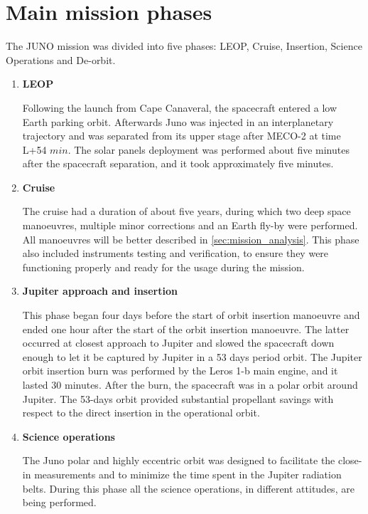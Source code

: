 \section{Main mission phases}
\label{sec:phases}

The JUNO mission was divided into five phases: LEOP, Cruise, Insertion, Science Operations and De-orbit.
\begin{enumerate}
    \item \textbf{LEOP} 
    
    Following the launch from Cape Canaveral, the spacecraft entered a low Earth parking orbit\cite{Juno_launch}.
     Afterwards Juno was injected in an interplanetary trajectory and was separated from its upper stage after MECO-2 at time L+54 $min$.
    The solar panels deployment was performed about five minutes after the spacecraft separation, and it took approximately five minutes.

    \item \textbf{Cruise}
    
    The cruise had a duration of about five years, during which two deep space manoeuvres, multiple minor corrections and an Earth fly-by were performed.
    All manoeuvres will be better described in \autoref{sec:mission_analysis}. This phase also included instruments testing and verification, to ensure they were functioning properly and ready for the usage during the mission. 

    \item \textbf{Jupiter approach and insertion}
    
    This phase began four days before the start of orbit insertion manoeuvre and ended one hour after the start of the orbit insertion manoeuvre. The latter occurred at closest approach to Jupiter and slowed the spacecraft down enough to let it be captured by Jupiter in a 53 days period orbit.
    The Jupiter orbit insertion burn was performed by the Leros 1-b main engine, and it lasted 30 minutes. After the burn, the spacecraft was in a polar orbit around Jupiter.
    The 53-days orbit provided substantial propellant savings with respect to the direct insertion in the operational orbit.

    \item \textbf{Science operations}
    
    The Juno polar and highly eccentric orbit was designed to facilitate the close-in measurements and to minimize the time spent in the Jupiter radiation belts. During this phase all the science operations, in different attitudes, are being performed.


\end{enumerate}

